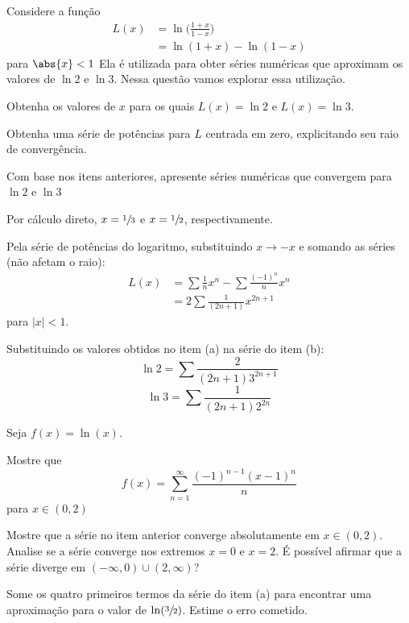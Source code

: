 \begin{exercises*}
\begin{exercise}
  Considere a função
  \begin{align*}
    L(x) & = \ln \bigg( \frac{1+x}{1-x}\bigg) \\
    & = \ln(1+x) - \ln(1-x)
  \end{align*}
  para $\abs{x} < 1$
  Ela é utilizada para obter séries numéricas que aproximam os valores de $\ln 2$ e $\ln 3$.
  Nessa questão vamos explorar essa utilização.
  \begin{alphalist}
    \item Obtenha os valores de $x$ para os quais $L(x)=\ln 2$ e $L(x)=\ln 3$.
    \item Obtenha uma série de potências para $L$ centrada em zero, explicitando seu raio de convergência.
    \item Com base nos itens anteriores, apresente séries numéricas que convergem para $\ln 2$ e $\ln 3$
  \end{alphalist}
  \begin{answer}
    \begin{alphalist}
      \item Por cálculo direto, \(x=\sfrac{1}{3}\) e \(x=\sfrac{1}{2}\), respectivamente.
      \item Pela série de potências do logaritmo, substituindo $x \to - x$
      e somando as séries (não afetam o raio):
      \begin{align*}
        L(x) & = \sum \frac{1}{n}x^n - \sum \frac{(-1)^n}{n}x^n \\
        & = 2\sum \frac{1}{(2n+1)}x^{2n+1}
      \end{align*}
      para $|x| < 1$.
      \item Substituindo os valores obtidos no item (a) na série do item (b):
      \[\ln 2 = \sum \frac{2}{(2n+1)3^{2n+1}}\]
      \[\ln 3 = \sum \frac{1}{(2n+1)2^{2n}}\]
    \end{alphalist}
  \end{answer}
\end{exercise}


\begin{exercise} Seja $f(x)=\ln(x)$.
  \begin{alphalist}
    \item Mostre que \[f(x)=\sum_{n=1}^\infty\frac{(-1)^{n-1}(x-1)^n}{n}\] para \(x\in (0,2)\)
    \item Mostre que a série no item anterior converge absolutamente em $x\in (0,2)$.
    Analise se a série converge nos extremos $x=0$ e $x=2$.
    É possível afirmar que a série diverge em $(-\infty, 0)\cup (2, \infty)$?
    \item Some os quatro primeiros termos da série do item (a)
    para encontrar uma aproximação para o valor de $\ln(\sfrac{3}{2})$.
    Estime o erro cometido.
  \end{alphalist}
\end{exercise}


\end{exercises*}
